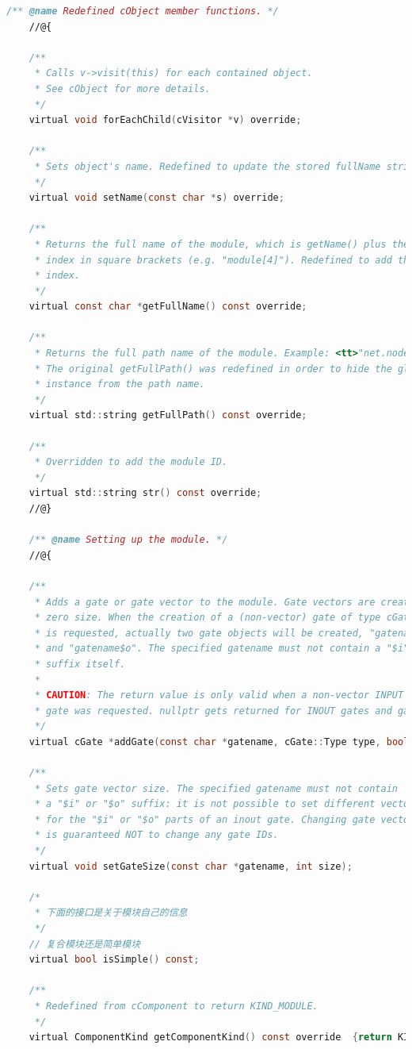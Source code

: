 \begin{lstlisting}[language=c]
    /** @name Redefined cObject member functions. */
    //@{

    /**
     * Calls v->visit(this) for each contained object.
     * See cObject for more details.
     */
    virtual void forEachChild(cVisitor *v) override;

    /**
     * Sets object's name. Redefined to update the stored fullName string.
     */
    virtual void setName(const char *s) override;

    /**
     * Returns the full name of the module, which is getName() plus the
     * index in square brackets (e.g. "module[4]"). Redefined to add the
     * index.
     */
    virtual const char *getFullName() const override;

    /**
     * Returns the full path name of the module. Example: <tt>"net.node[12].gen"</tt>.
     * The original getFullPath() was redefined in order to hide the global cSimulation
     * instance from the path name.
     */
    virtual std::string getFullPath() const override;

    /**
     * Overridden to add the module ID.
     */
    virtual std::string str() const override;
    //@}

    /** @name Setting up the module. */
    //@{

    /**
     * Adds a gate or gate vector to the module. Gate vectors are created with
     * zero size. When the creation of a (non-vector) gate of type cGate::INOUT
     * is requested, actually two gate objects will be created, "gatename$i"
     * and "gatename$o". The specified gatename must not contain a "$i" or "$o"
     * suffix itself.
     *
     * CAUTION: The return value is only valid when a non-vector INPUT or OUTPUT
     * gate was requested. nullptr gets returned for INOUT gates and gate vectors.
     */
    virtual cGate *addGate(const char *gatename, cGate::Type type, bool isvector=false);

    /**
     * Sets gate vector size. The specified gatename must not contain
     * a "$i" or "$o" suffix: it is not possible to set different vector size
     * for the "$i" or "$o" parts of an inout gate. Changing gate vector size
     * is guaranteed NOT to change any gate IDs.
     */
    virtual void setGateSize(const char *gatename, int size);

    /*
     * 下面的接口是关于模块自己的信息
     */
    // 复合模块还是简单模块
    virtual bool isSimple() const;

    /**
     * Redefined from cComponent to return KIND_MODULE.
     */
    virtual ComponentKind getComponentKind() const override  {return KIND_MODULE;}


\end{lstlisting}
